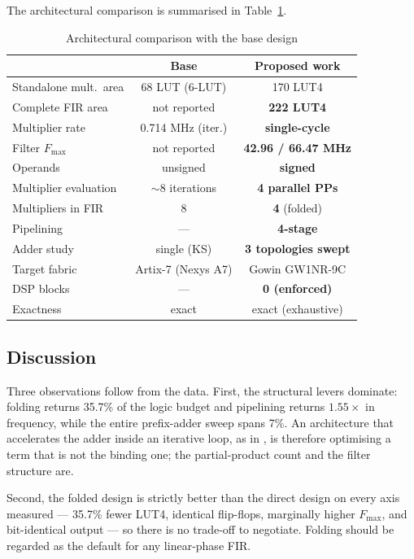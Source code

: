 \documentclass[conference]{IEEEtran}
\begin{document}
The architectural comparison is summarised in Table~\ref{tab:base}.

\begin{table}[t]
\caption{Architectural comparison with the base design \cite{base}}
\label{tab:base}
\centering
\begin{tabular}{@{}lcc@{}}
\toprule
 & \textbf{Base \cite{base}} & \textbf{Proposed work} \\
\midrule
Standalone mult.\ area & 68 LUT (6-LUT)  & 170 LUT4 \\
Complete FIR area    & not reported      & \textbf{222 LUT4} \\
Multiplier rate      & 0.714 MHz (iter.) & \textbf{single-cycle} \\
Filter $F_{\max}$    & not reported      & \textbf{42.96 / 66.47 MHz} \\
Operands             & unsigned          & \textbf{signed} \\
Multiplier evaluation & $\sim$8 iterations & \textbf{4 parallel PPs} \\
Multipliers in FIR   & 8                 & \textbf{4} (folded) \\
Pipelining           & ---               & \textbf{4-stage} \\
Adder study          & single (KS)       & \textbf{3 topologies swept} \\
Target fabric        & Artix-7 (Nexys A7) & Gowin GW1NR-9C \\
DSP blocks           & ---               & \textbf{0 (enforced)} \\
Exactness            & exact             & exact (exhaustive) \\
\bottomrule
\end{tabular}
\end{table}

\subsection{Discussion}

Three observations follow from the data. First, the structural levers
dominate: folding returns 35.7\% of the logic budget and pipelining
returns $1.55\times$ in frequency, while the entire prefix-adder sweep
spans 7\%. An architecture that accelerates the adder inside an
iterative loop, as in \cite{base}, is therefore optimising a term that
is not the binding one; the partial-product count and the filter
structure are.

Second, the folded design is strictly better than the direct design on
every axis measured --- 35.7\% fewer LUT4, identical flip-flops,
marginally higher $F_{\max}$, and bit-identical output --- so there is no
trade-off to negotiate. Folding should be regarded as the default for
any linear-phase FIR.
\end{document}

